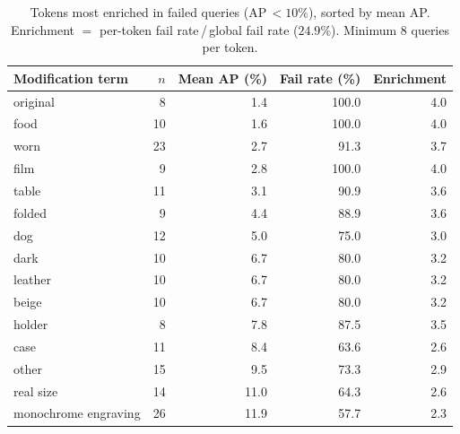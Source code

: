 \begin{table}[htbp]
\centering
\caption{Tokens most enriched in failed queries (AP\,$<\!10\%$), sorted by
mean AP. Enrichment $= $ per-token fail rate\,/\,global fail rate ($24.9\%$).
Minimum 8 queries per token.}
\label{tab:app_worst_tokens}
\small
\begin{tabular}{l r r r r}
\toprule
Modification term & $n$ & Mean AP (\%) & Fail rate (\%) & Enrichment \\
\midrule
original              &  8 &  1.4 & 100.0 & 4.0 \\
food                  & 10 &  1.6 & 100.0 & 4.0 \\
worn                  & 23 &  2.7 &  91.3 & 3.7 \\
film                  &  9 &  2.8 & 100.0 & 4.0 \\
table                 & 11 &  3.1 &  90.9 & 3.6 \\
folded                &  9 &  4.4 &  88.9 & 3.6 \\
dog                   & 12 &  5.0 &  75.0 & 3.0 \\
dark                  & 10 &  6.7 &  80.0 & 3.2 \\
leather               & 10 &  6.7 &  80.0 & 3.2 \\
beige                 & 10 &  6.7 &  80.0 & 3.2 \\
holder                &  8 &  7.8 &  87.5 & 3.5 \\
case                  & 11 &  8.4 &  63.6 & 2.6 \\
other                 & 15 &  9.5 &  73.3 & 2.9 \\
real size             & 14 & 11.0 &  64.3 & 2.6 \\
monochrome engraving  & 26 & 11.9 &  57.7 & 2.3 \\
\bottomrule
\end{tabular}
\end{table}

